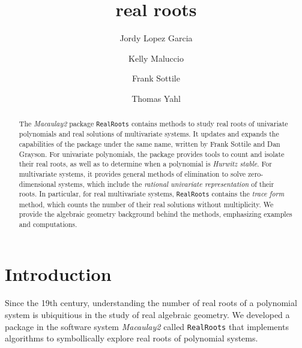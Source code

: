 \documentclass[12pt]{amsart}
\title{real roots}
\author[J.~Lopez Garcia]{Jordy Lopez Garcia}
\author[K.~Maluccio]{Kelly Maluccio}
\author[F.~Sottile]{Frank Sottile}
\author[T.~Yahl]{Thomas Yahl}
\theoremstyle{definition}
\begin{document}
%
%

\begin{abstract}

The \textit{Macaulay2} package \texttt{RealRoots} contains methods to study real roots of univariate polynomials and real solutions of multivariate systems. It updates and expands the capabilities of the package under the same name, written by Frank Sottile and Dan Grayson. For univariate polynomials, the package provides tools to count and isolate their real roots, as well as to determine when a polynomial is \textit{Hurwitz stable}. For multivariate systems, it provides general methods of elimination to solve zero-dimensional systems, which include the \textit{rational univariate representation} of their roots. In particular, for real multivariate systems, \texttt{RealRoots} contains the \textit{trace form} method, which counts the number of their real solutions without multiplicity. We provide the algebraic geometry background behind the methods, emphasizing examples and computations.

\end{abstract}

\maketitle


\section*{Introduction}

Since the 19th century, understanding the number of real roots of a polynomial system is ubiquitious in the study of real algebraic geometry. We developed a package in the software system \textit{Macaulay2} called \texttt{RealRoots} that implements algorithms to symbollically explore real roots of polynomial systems.
\end{document}
